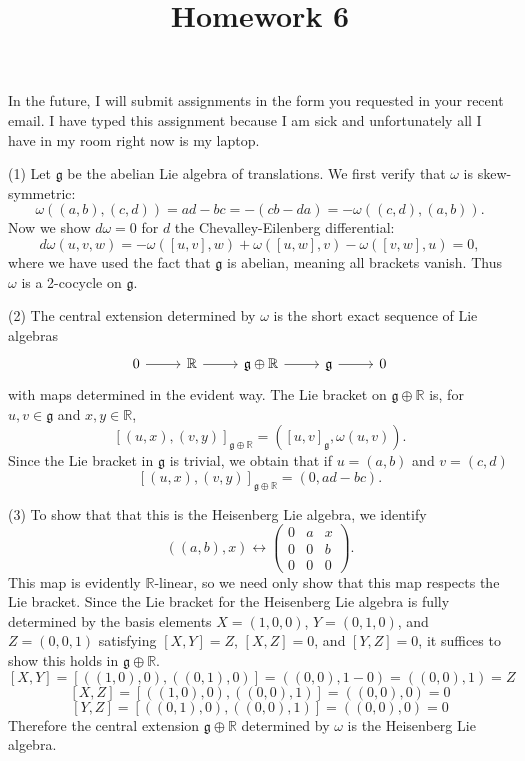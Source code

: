 \documentclass[11pt, letterpaper]{article}
\title{Homework 6}
\theoremstyle{plain}
\begin{document}
\makeproblem

\begin{center}
	In the future, I will submit assignments in the form you requested in your recent email. I have typed this assignment because I am sick and unfortunately all I have in my room right now is my laptop.
\end{center}

(1) Let $\mathfrak{g} $ be the abelian Lie algebra of translations. We first verify that $\omega $ is skew-symmetric:
\[
	\omega ((a,b),(c,d)) = ad - bc = -(cb - da) = -\omega ((c,d),(a,b))
.\]
Now we show $d\omega =0$ for $d$ the Chevalley-Eilenberg differential:
\[
	d\omega (u,v,w) = -\omega ([u,v],w)+\omega ([u,w],v)-\omega ([v,w],u)=0
,\]
where we have used the fact that $\mathfrak{g} $ is abelian, meaning all brackets vanish. Thus $\omega $ is a 2-cocycle on $\mathfrak{g} $.

(2) The central extension determined by $\omega $ is the short exact sequence of Lie algebras
\[\begin{tikzcd}[row sep = 2.5em, column sep = 2.5em]
0\ar[r]  & \mathbb{R} \ar[r]  & \mathfrak{g}\oplus \mathbb{R}  \ar[r]  & \mathfrak{g}  \ar[r]  & 0
\end{tikzcd}\]
with maps determined in the evident way. The Lie bracket on $\mathfrak{g} \oplus \mathbb{R} $ is, for $u,v\in \mathfrak{g} $ and $x,y\in\mathbb{R} $,
\[
	[(u,x),(v,y)]_{\mathfrak{g} \oplus \mathbb{R} } =([u,v]_\mathfrak{g} ,\omega (u,v)) 
.\]
Since the Lie bracket in $\mathfrak{g} $ is trivial, we obtain that if $u=(a,b)$ and $v=(c,d)$
\[
	[(u,x),(v,y)]_{\mathfrak{g} \oplus \mathbb{R} } =(0,ad-bc)
.\]

(3) To show that that this is the Heisenberg Lie algebra, we identify
\[
	((a,b),x) \longleftrightarrow \begin{pmatrix}
	0 & a & x \\
	0 & 0 & b \\
	0 & 0 & 0
	\end{pmatrix}
.\]
This map is evidently $\mathbb{R} $-linear, so we need only show that this map respects the Lie bracket. Since the Lie bracket for the Heisenberg Lie algebra is fully determined by the basis elements $X=(1,0,0)$, $Y=(0,1,0)$, and $Z=(0,0,1)$ satisfying $[X,Y]=Z$, $[X,Z]=0$, and $[Y,Z]=0$, it suffices to show this holds in $\mathfrak{g} \oplus \mathbb{R} $.
\[
	[X,Y]=[((1,0),0),((0,1),0)]=((0,0),1-0)=((0,0),1)=Z
\]
\[
	[X,Z]=[((1,0),0),((0,0),1)]=((0,0),0)=0
\]
\[
	[Y,Z]=[((0,1),0),((0,0),1)]=((0,0),0)=0
\]
Therefore the central extension $\mathfrak{g} \oplus \mathbb{R} $ determined by $\omega $ is the Heisenberg Lie algebra.
\end{document}
